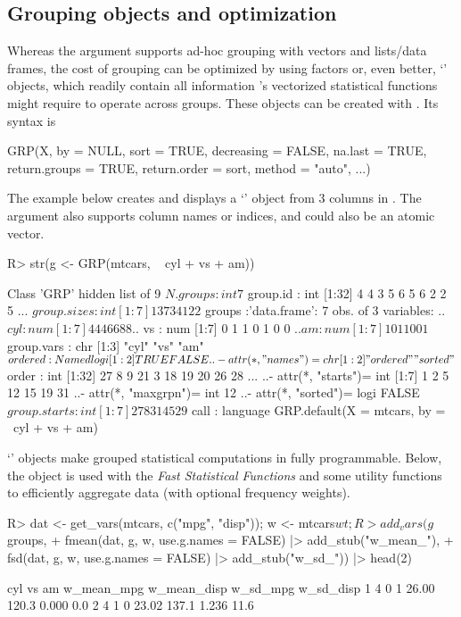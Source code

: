 \documentclass[nojss]{jss} %
\newcommand{\class}[1]{`\code{#1}'}
\begin{document}
\subsection{Grouping objects and optimization}
%
Whereas the  argument supports ad-hoc grouping with vectors and lists/data frames, the cost of grouping can be optimized by using factors or, even better, \class{GRP} objects, which readily contain all information 's vectorized statistical functions might require to operate across groups. These objects can be created with . Its syntax is
\begin{Code}
GRP(X, by = NULL, sort = TRUE, decreasing = FALSE, na.last = TRUE,
  return.groups = TRUE, return.order = sort, method = "auto", ...)
\end{Code}
 The example below creates and displays a \class{GRP} object from 3 columns in \href{https://www.rdocumentation.org/packages/datasets/versions/3.6.2/topics/mtcars}{}. The  argument also supports column names or indices, and  could also be an atomic vector.
%
\begin{Schunk}
\begin{Sinput}
R> str(g <- GRP(mtcars, ~ cyl + vs + am))
\end{Sinput}
\begin{Soutput}
Class 'GRP'  hidden list of 9
 $ N.groups    : int 7
 $ group.id    : int [1:32] 4 4 3 5 6 5 6 2 2 5 ...
 $ group.sizes : int [1:7] 1 3 7 3 4 12 2
 $ groups      :'data.frame':	7 obs. of  3 variables:
  ..$ cyl: num [1:7] 4 4 4 6 6 8 8
  ..$ vs : num [1:7] 0 1 1 0 1 0 0
  ..$ am : num [1:7] 1 0 1 1 0 0 1
 $ group.vars  : chr [1:3] "cyl" "vs" "am"
 $ ordered     : Named logi [1:2] TRUE FALSE
  ..- attr(*, "names")= chr [1:2] "ordered" "sorted"
 $ order       : int [1:32] 27 8 9 21 3 18 19 20 26 28 ...
  ..- attr(*, "starts")= int [1:7] 1 2 5 12 15 19 31
  ..- attr(*, "maxgrpn")= int 12
  ..- attr(*, "sorted")= logi FALSE
 $ group.starts: int [1:7] 27 8 3 1 4 5 29
 $ call        : language GRP.default(X = mtcars, by = ~cyl + vs + am)
\end{Soutput}
\end{Schunk}
%
\class{GRP} objects make grouped statistical computations in  fully programmable. Below, the object is used with the \emph{Fast Statistical Functions} and some utility functions to efficiently aggregate data (with optional frequency weights).
%
\begin{Schunk}
\begin{Sinput}
R> dat <- get_vars(mtcars, c("mpg", "disp")); w <- mtcars$wt;
R> add_vars(g$groups,
+    fmean(dat, g, w, use.g.names = FALSE) |> add_stub("w_mean_"),
+    fsd(dat, g, w, use.g.names = FALSE) |> add_stub("w_sd_")) |> head(2)
\end{Sinput}
\begin{Soutput}
  cyl vs am w_mean_mpg w_mean_disp w_sd_mpg w_sd_disp
1   4  0  1      26.00       120.3    0.000       0.0
2   4  1  0      23.02       137.1    1.236      11.6
\end{Soutput}
\end{Schunk}
\end{document}
